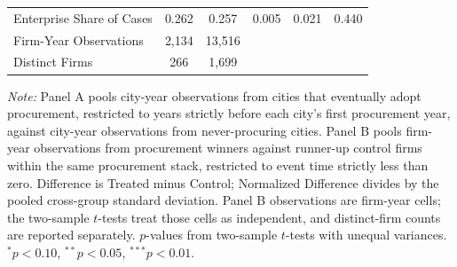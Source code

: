 \begin{table}[!htbp]
\begin{threeparttable}
\begin{tabular}{lccccc}
Enterprise Share of Cases & 0.262 & 0.257 & 0.005 & 0.021 & 0.440 \\
\addlinespace
Firm-Year Observations & 2,134 & 13,516 &  &  &  \\
Distinct Firms & 266 & 1,699 &  &  &  \\
\bottomrule
\end{tabular}
\begin{tablenotes}[flushleft]
\footnotesize
\item \textit{Note:} Panel A pools city-year observations from cities that eventually adopt procurement, restricted to years strictly before each city's first procurement year, against city-year observations from never-procuring cities. Panel B pools firm-year observations from procurement winners against runner-up control firms within the same procurement stack, restricted to event time strictly less than zero. Difference is Treated minus Control; Normalized Difference divides by the pooled cross-group standard deviation. Panel B observations are firm-year cells; the two-sample $t$-tests treat those cells as independent, and distinct-firm counts are reported separately. $p$-values from two-sample $t$-tests with unequal variances. $^{*}p<0.10$, $^{**}p<0.05$, $^{***}p<0.01$.
\end{tablenotes}
\end{threeparttable}
\end{table}
